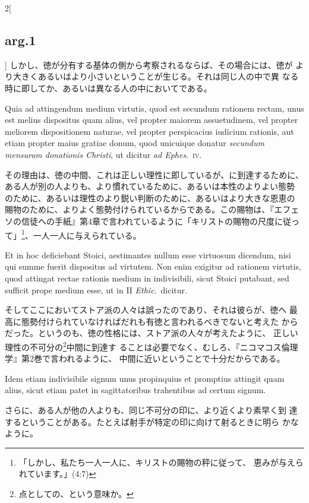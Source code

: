 \documentclass[paper=a4paper,fontsize=10pt,jafontsize=9pt,titlepage]{jlreq}
\begin{document}
\begin{paracol}{2}[\subsection{arg.1}]
しかし、徳が分有する基体の側から考察されるならば、その場合には、徳が
 より大きくあるいはより小さいということが生じる。それは同じ人の中で異
 なる時に即してか、あるいは異なる人の中においてである。

\switchcolumn*

Quia ad attingendum medium virtutis, quod est secundum rationem
 rectam, unus est melius dispositus quam alius, vel propter maiorem
 assuetudinem, vel propter meliorem dispositionem naturae, vel propter
 perspicacius iudicium rationis, aut etiam propter maius gratiae
 donum, quod unicuique donatur {\itshape secundum mensuram donationis
 Christi}, ut dicitur {\itshape ad Ephes}.~{\scshape iv}.

\switchcolumn

その理由は、徳の中間、これは正しい理性に即しているが、に到達するために、
ある人が別の人よりも、より慣れているために、あるいは本性のよりよい態勢
のために、あるいは理性のより鋭い判断のために、あるいはより大きな恩恵の
賜物のために、よりよく態勢付けられているからである。この賜物は、『エフェ
ソの信徒への手紙』第4章で言われているように「キリストの賜物の尺度に従っ
て」\footnote{「しかし、私たち一人一人に、キリストの賜物の秤に従って、
恵みが与えられています。」(4:7)}、一人一人に与えられている。

\switchcolumn*

Et in hoc deficiebant Stoici, aestimantes nullum esse
 virtuosum dicendum, nisi qui summe fuerit dispositus ad virtutem. Non
 enim exigitur ad rationem virtutis, quod attingat rectae rationis
 medium in indivisibili, sicut Stoici putabant, sed sufficit prope
 medium esse, ut in II {\itshape Ethic}.~dicitur.

\switchcolumn

そしてここにおいてストア派の人々は誤ったのであり、それは彼らが、徳へ
 最高に態勢付けられていなければだれも有徳と言われるべきでないと考えた
 からだった。というのも、徳の性格には、ストア派の人々が考えたように、
 正しい理性の不可分の\footnote{点としての、という意味か。}中間に到達す
 ることは必要でなく、むしろ、『ニコマコス倫理学』第2巻で言われるように、
 中間に近いということで十分だからである。

\switchcolumn*

Idem etiam indivisibile signum unus propinquius et promptius attingit
 quam alius, sicut etiam patet in sagittatoribus trahentibus ad certum
 signum.

\switchcolumn

さらに、ある人が他の人よりも、同じ不可分の印に、より近くより素早く到
 達するということがある。たとえば射手が特定の印に向けて射るときに明ら
 かなように。


\end{paracol}
\end{document}
